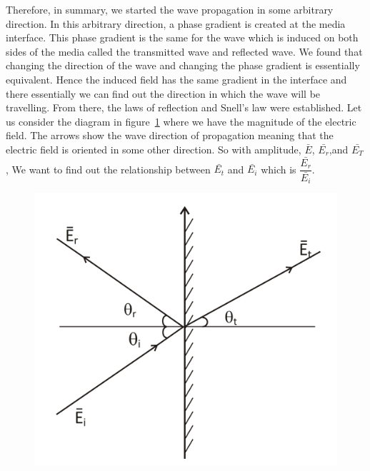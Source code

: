 Therefore, in summary, we started the wave propagation in some arbitrary direction. In this arbitrary direction, a phase gradient is created at the media interface. This phase gradient is the same for the wave which is induced on both sides of the media called the transmitted wave and reflected wave. We found that changing the direction of the wave and changing the phase gradient is essentially equivalent. Hence the induced field has the same gradient in the interface and there essentially we can find out the direction in which the wave will be travelling. From there, the laws of reflection and Snell's law were established. Let us consider the diagram in figure~\ref{fig:group30f} where we have the magnitude of the electric field. The arrows show the wave direction of propagation meaning that the electric field is oriented in some other direction. So with amplitude, $\bar{E}$, $\bar{E_r}$,and $\bar{E_T}$, We want to find out the relationship between $\bar{E_t}$ and $\bar{E_i}$ which is $\dfrac{\bar{E_r}}{\bar{E_i}}$.
\begin{figure}[h]
\centering
\includegraphics[width=.7\linewidth]{graphics/group30f}
\caption{}
\label{fig:group30f}
\end{figure}


